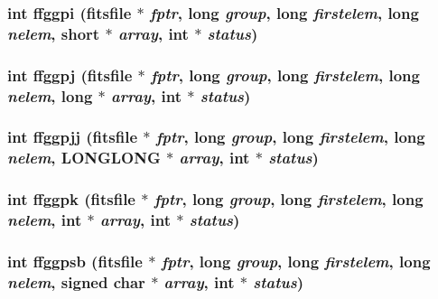 \subsubsection{\setlength{\rightskip}{0pt plus 5cm}int ffggpi (\bf{fitsfile} $\ast$ {\em fptr}, long {\em group}, long {\em firstelem}, long {\em nelem}, short $\ast$ {\em array}, int $\ast$ {\em status})}\label{fitsio_8h_aeab60257fb251921567291948d553a2}


\subsubsection{\setlength{\rightskip}{0pt plus 5cm}int ffggpj (\bf{fitsfile} $\ast$ {\em fptr}, long {\em group}, long {\em firstelem}, long {\em nelem}, long $\ast$ {\em array}, int $\ast$ {\em status})}\label{fitsio_8h_99232aa89514e1335fced48812badbd8}


\subsubsection{\setlength{\rightskip}{0pt plus 5cm}int ffggpjj (\bf{fitsfile} $\ast$ {\em fptr}, long {\em group}, long {\em firstelem}, long {\em nelem}, \bf{LONGLONG} $\ast$ {\em array}, int $\ast$ {\em status})}\label{fitsio_8h_76b52ae73ab6d4139c2f8289663511c2}


\subsubsection{\setlength{\rightskip}{0pt plus 5cm}int ffggpk (\bf{fitsfile} $\ast$ {\em fptr}, long {\em group}, long {\em firstelem}, long {\em nelem}, int $\ast$ {\em array}, int $\ast$ {\em status})}\label{fitsio_8h_09f7024b2b7c61b65c69753195f596e2}


\subsubsection{\setlength{\rightskip}{0pt plus 5cm}int ffggpsb (\bf{fitsfile} $\ast$ {\em fptr}, long {\em group}, long {\em firstelem}, long {\em nelem}, signed char $\ast$ {\em array}, int $\ast$ {\em status})}\label{fitsio_8h_be4013a55c9a0fc0e0c4bb9708709d9a}


